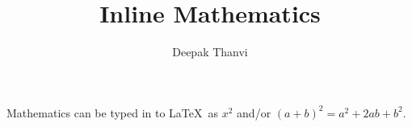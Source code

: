 \documentclass{article}
\title{Inline Mathematics}
\author{Deepak Thanvi}
\begin{document}
\maketitle
Mathematics can be typed in to \LaTeX\ as $x^2$ and/or \((a+b)^2 = a^2 + 2ab+ b^2\). %
\end{document}
